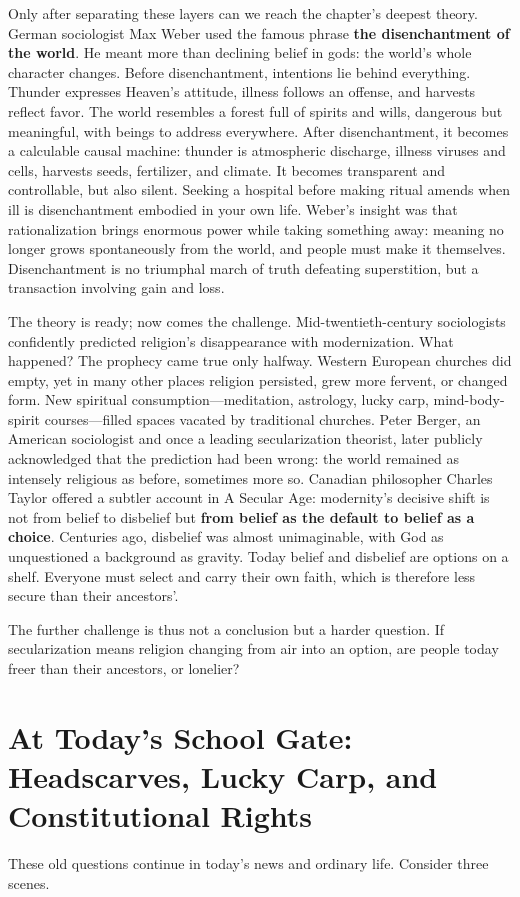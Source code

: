 Only after separating these layers can we reach the chapter's deepest theory. German sociologist Max Weber used the famous phrase \textbf{the disenchantment of the world}. He meant more than declining belief in gods: the world's whole character changes. Before disenchantment, intentions lie behind everything. Thunder expresses Heaven's attitude, illness follows an offense, and harvests reflect favor. The world resembles a forest full of spirits and wills, dangerous but meaningful, with beings to address everywhere. After disenchantment, it becomes a calculable causal machine: thunder is atmospheric discharge, illness viruses and cells, harvests seeds, fertilizer, and climate. It becomes transparent and controllable, but also silent. Seeking a hospital before making ritual amends when ill is disenchantment embodied in your own life. Weber's insight was that rationalization brings enormous power while taking something away: meaning no longer grows spontaneously from the world, and people must make it themselves. Disenchantment is no triumphal march of truth defeating superstition, but a transaction involving gain and loss.

The theory is ready; now comes the challenge. Mid-twentieth-century sociologists confidently predicted religion's disappearance with modernization. What happened? The prophecy came true only halfway. Western European churches did empty, yet in many other places religion persisted, grew more fervent, or changed form. New spiritual consumption---meditation, astrology, lucky carp, mind-body-spirit courses---filled spaces vacated by traditional churches. Peter Berger, an American sociologist and once a leading secularization theorist, later publicly acknowledged that the prediction had been wrong: the world remained as intensely religious as before, sometimes more so. Canadian philosopher Charles Taylor offered a subtler account in A Secular Age: modernity's decisive shift is not from belief to disbelief but \textbf{from belief as the default to belief as a choice}. Centuries ago, disbelief was almost unimaginable, with God as unquestioned a background as gravity. Today belief and disbelief are options on a shelf. Everyone must select and carry their own faith, which is therefore less secure than their ancestors'.

The further challenge is thus not a conclusion but a harder question. If secularization means religion changing from air into an option, are people today freer than their ancestors, or lonelier?

\section[Today: Faith and Public Rights]{At Today's School Gate: Headscarves, Lucky Carp, and Constitutional Rights}
These old questions continue in today's news and ordinary life. Consider three scenes.

